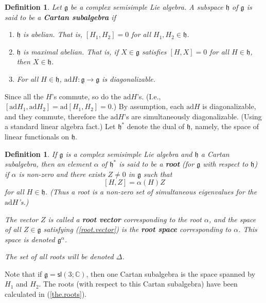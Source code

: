 \documentclass{amsbook}
\let \frak = \mathfrak
\theoremstyle{plain}
\newtheorem{definition}[theorem]{Definition}
\numberwithin{equation}{chapter}
\numberwithin{theorem}{chapter}
\begin{document}
\begin{definition}
Let $\frak{g}$ be a complex semisimple Lie algebra. A subspace $\frak{h}$ of
$\frak{g}$ is said to be a \textbf{Cartan subalgebra} if

\begin{enumerate}
\item $\frak{h}$ is abelian. That is, $\left[  H_{1},H_{2}\right]  =0$ for all
$H_{1},H_{2}\in\frak{h}$.

\item $\frak{h}$ is maximal abelian. That is, if $X\in\frak{g}$ satisfies
$\left[  H,X\right]  =0$ for all $H\in\frak{h}$, then $X\in\frak{h}$.

\item  For all $H\in\frak{h}$, $\mathrm{ad}H:\frak{g}\rightarrow\frak{g}$ is diagonalizable.
\end{enumerate}
\end{definition}

Since all the $H$'s commute, so do the $\mathrm{ad}H$'s. (I.e., $\left[
\mathrm{ad}H_{1},\mathrm{ad}H_{2}\right]  =\mathrm{ad}\left[  H_{1}%
,H_{2}\right]  =0$.) By assumption, each $\mathrm{ad}H$ is diagonalizable, and
they commute, therefore the $\mathrm{ad}H$'s are simultaneously
diagonalizable. (Using a standard linear algebra fact.) Let $\frak{h}^{*}$
denote the dual of $\frak{h}$, namely, the space of linear functionals on
$\frak{h}$.

\begin{definition}
If $\frak{g}$ is a complex semisimple Lie algebra and $\frak{h}$ a Cartan
subalgebra, then an element $\alpha$ of $\frak{h}^{\ast}$ is said to be a
\textbf{root} (for $\frak{g}$ with respect to $\frak{h}$) if $\alpha$ is
non-zero and there exists $Z\neq0$ in $\frak{g}$ such that
\begin{equation}
\left[  H,Z\right]  =\alpha(H)Z\label{root.vector}%
\end{equation}
for all $H\in\frak{h}$. (Thus a root is a non-zero set of simultaneous
eigenvalues for the $\mathrm{ad}H$'s.)

The vector $Z$ is called a \textbf{root vector} corresponding to the root
$\alpha$, and the space of all $Z\in\frak{g}$ satisfying (\ref{root.vector})
is the \textbf{root space} corresponding to $\alpha$. This space is denoted
$\frak{g}^{\alpha}$.

The set of all roots will be denoted $\Delta$.
\end{definition}

Note that if $\frak{g}=\mathsf{sl}\left(  3;\mathbb{C}\right)  $, then one
Cartan subalgebra is the space spanned by $H_{1}$ and $H_{2}$. The roots (with
respect to this Cartan subalgebra) have been calculated in (\ref{the.roots}).
\end{document}
